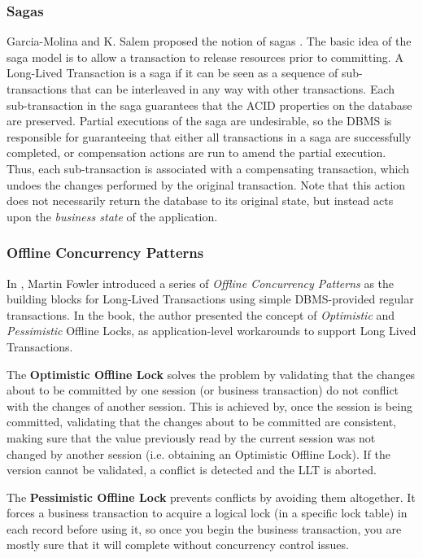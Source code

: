 \documentclass{llncs}
\begin{document}
\subsubsection{Sagas}
\label{sec:sagas}

Garcia-Molina and K. Salem proposed the notion of sagas
\cite{garcia1987sagas}. The basic idea of the saga model is to allow a
transaction to release resources prior to committing. A Long-Lived
Transaction is a saga if it can be seen as a sequence of
sub-transactions that can be interleaved in any way with other
transactions. Each sub-transaction in the saga guarantees that the
ACID properties on the database are preserved. Partial executions of
the saga are undesirable, so the DBMS is responsible for guaranteeing
that either all transactions in a saga are successfully completed, or
compensation actions are run to amend the partial execution. Thus,
each sub-transaction is associated with a compensating transaction,
which undoes the changes performed by the original transaction. Note
that this action does not necessarily return the database to its
original state, but instead acts upon the {\it business state} of the
application.

\subsubsection{Offline Concurrency Patterns}

In \cite{fowler2003patterns}, Martin Fowler introduced a series of
{\it Offline Concurrency Patterns} as the building blocks for
Long-Lived Transactions using simple DBMS-provided regular
transactions. In the book, the author presented the concept of {\it
  Optimistic} and {\it Pessimistic} Offline Locks, as
application-level workarounds to support Long Lived Transactions.

The {\bf Optimistic Offline Lock} solves the problem by validating
that the changes about to be committed by one session (or business
transaction) do not conflict with the changes of another session. This
is achieved by, once the session is being committed, validating that
the changes about to be committed are consistent, making sure that the
value previously read by the current session was not changed by
another session (i.e. obtaining an Optimistic Offline Lock). If the
version cannot be validated, a conflict is detected and the LLT is aborted.

The {\bf Pessimistic Offline Lock} prevents conflicts by avoiding them
altogether. It forces a business transaction to acquire a logical lock
(in a specific lock table) in each record before using it, so once you
begin the business transaction, you are mostly sure that it will
complete without concurrency control issues.
\end{document}
